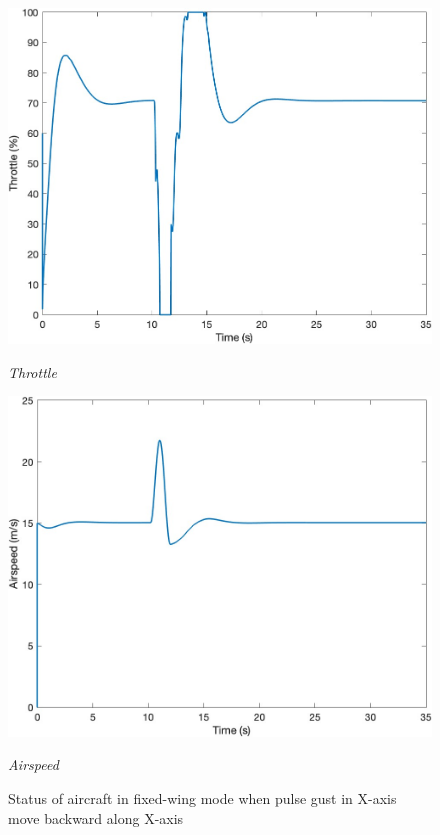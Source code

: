 \begin{figure}[htbp]
\begin{minipage}[b]{0.45\textwidth}
    \centering
    \includegraphics[width=\textwidth]{Images/Gust/Gust FWD pulse 0428/5 Throttle_1.jpg}
    \caption*{\textit{Throttle}}
  \end{minipage}
  \hfil
  \begin{minipage}[b]{0.45\textwidth}
    \centering
    \includegraphics[width=\textwidth]{Images/Gust/Gust FWD pulse 0428/6 Airspeed_1.jpg}
    \caption*{\textit{Airspeed}}
  \end{minipage}
  \caption{Status of aircraft in fixed-wing mode when pulse gust in X-axis move backward along X-axis}
  \label{fig:Gust FWD pulse -x}
\end{figure}

